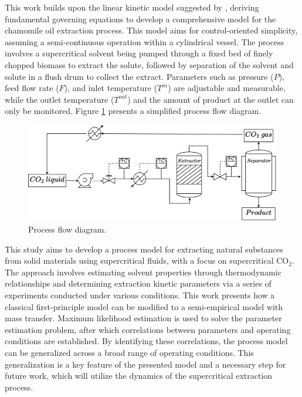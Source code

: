 \documentclass[a4paper,fleqn]{cas-dc}
\begin{document}
	This work builds upon the linear kinetic model suggested by \citet{Reverchon1996}, deriving fundamental governing equations to develop a comprehensive model for the chamomile oil extraction process. This model aims for control-oriented simplicity, assuming a semi-continuous operation within a cylindrical vessel. The process involves a supercritical solvent being pumped through a fixed bed of finely chopped biomass to extract the solute, followed by separation of the solvent and solute in a flush drum to collect the extract. Parameters such as pressure ($P$), feed flow rate ($F$), and inlet temperature ($T^{in}$) are adjustable and measurable, while the outlet temperature ($T^{out}$) and the amount of product at the outlet can only be monitored. Figure \ref{fig: SFE_drawing} presents a simplified process flow diagram.
	
	\begin{figure}[h!]
		\centering
		\includegraphics[width=\columnwidth]{Figures/PFD.drawio.pdf}
		\caption{Process flow diagram.}
		\label{fig: SFE_drawing}
	\end{figure}
	
	This study aims to develop a process model for extracting natural substances from solid materials using supercritical fluids, with a focus on supercritical CO$_2$. The approach involves estimating solvent properties through thermodynamic relationships and determining extraction kinetic parameters via a series of experiments conducted under various conditions. This work presents how a classical first-principle model can be modified to a semi-empirical model with mass transfer. Maximum likelihood estimation is used to solve the parameter estimation problem, after which correlations between parameters and operating conditions are established. By identifying these correlations, the process model can be generalized across a broad range of operating conditions. This generalization is a key feature of the presented model and a necessary step for future work, which will utilize the dynamics of the supercritical extraction process.
	
\end{document}
